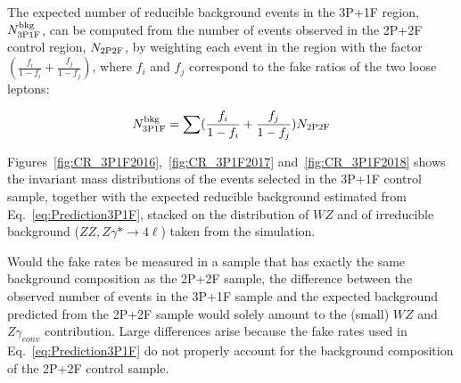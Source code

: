 The expected number of reducible background events in the 3P+1F region,
$N^{\rm bkg}_{\rm 3P1F}$, can be computed from the number of events
observed in the 2P+2F control region, $N_{\rm 2P2F}$, by weighting each
event in the region with the factor $(\frac{f_{i}}{1-f_{i}}
+ \frac{f_{j}}{1-f_{j}})$, where $f_{i}$ and $f_{j}$ correspond to the
fake ratios of the two loose leptons:

\begin{equation} 
\label{eq:Prediction3P1F}
N^{\rm bkg}_{\rm 3P1F} = \sum (\frac{f_{i}}{1-f_{i}}
+ \frac{f_{j}}{1-f_{j}}) N_{\rm 2P2F}
\end{equation} 

Figures~\ref{fig:CR_3P1F2016},~\ref{fig:CR_3P1F2017} and~\ref{fig:CR_3P1F2018} shows the invariant mass distributions of the
events selected in the 3P+1F control sample, together with the expected
reducible background estimated from Eq.~\ref{eq:Prediction3P1F},
stacked on the distribution
of $WZ$ and of irreducible background ($ZZ, Z\gamma* \to 4\ell$) taken from the simulation.

Would the fake rates be measured in a sample that has exactly the same
background composition as the 2P+2F sample, the difference between the
observed number of events in the 3P+1F sample and the expected background
predicted from the 2P+2F sample would solely amount to the (small) $WZ$ and $Z\gamma_{conv}$
contribution. Large differences arise because the fake rates used in
Eq.~\ref{eq:Prediction3P1F} do not properly account for the background
composition of the 2P+2F control sample.


